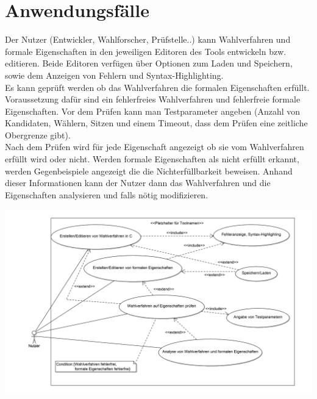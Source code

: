 \documentclass[a4paper]{scrreprt}
\begin{document}
\section{Anwendungsfälle}
Der Nutzer (Entwickler, Wahlforscher, Prüfstelle..) kann Wahlverfahren und formale Eigenschaften in den jeweiligen Editoren des Tools entwickeln bzw. editieren.
Beide Editoren verfügen über Optionen zum Laden und Speichern, sowie dem Anzeigen von Fehlern und Syntax-Highlighting.\\
Es kann geprüft werden ob das Wahlverfahren die formalen Eigenschaften erfüllt. Voraussetzung dafür sind ein fehlerfreies Wahlverfahren und fehlerfreie formale Eigenschaften. Vor dem Prüfen kann man Testparameter angeben (Anzahl von Kandidaten, Wählern, Sitzen und einem Timeout, dass dem Prüfen eine zeitliche Obergrenze gibt).\\
Nach dem Prüfen wird für jede Eigenschaft angezeigt ob sie vom Wahlverfahren erfüllt wird oder nicht. Werden formale Eigenschaften als nicht erfüllt erkannt, werden Gegenbeispiele angezeigt die die Nichterfüllbarkeit beweisen. Anhand dieser Informationen kann der Nutzer dann das Wahlverfahren und die Eigenschaften analysieren und falls nötig modifizieren.


\hspace{-2cm}\includegraphics[scale=0.09]{UseCaseDiagram.png}

	
\end{document}

